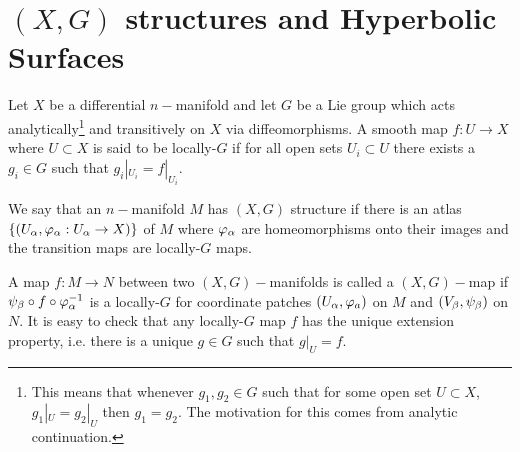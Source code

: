 \section{$(X,G)$ structures and Hyperbolic Surfaces}\label{sec:gx}
Let $X$ be a differential $n-$manifold and let $G$ be a Lie group which acts analytically\footnote{This means that whenever $g_1,g_2\in G$ such that for some open set $U\subset X$, $g_1|_{U} = g_2|_{U}$ then $g_1=g_2$. The motivation for this comes from analytic continuation.} and transitively on $X$ via diffeomorphisms. A smooth map $f:U\to X$ where $U\subset X$ is said to be locally-$G$ if for all open sets $U_i\subset U$ there exists a $g_i\in G$ such that $g_i|_{U_i} = f|_{U_i}$.
\begin{definition}
   We say that an $n-$manifold $M$ has $(X,G)$ structure if there is an atlas $\{(U_\alpha, \varphi_\alpha:U_\alpha\to X)\}$ of $M$ where $\varphi_\alpha$ are homeomorphisms onto their images and the transition maps are locally-$G$ maps. 
\end{definition}
A map $f:M\to N$ between two $(X,G)-$manifolds is called a $(X,G)-$map if $\psi_\beta\circ f\circ \varphi_\alpha^{-1}$ is a locally-$G$ for coordinate patches $(U_\alpha,\varphi_a)$ on $M$ and $(V_\beta,\psi_\beta)$ on $N$. It is easy to check that any locally-$G$ map $f$ has the unique extension property, i.e. there is a unique $g\in G$ such that $g|_{U} = f$.\\

